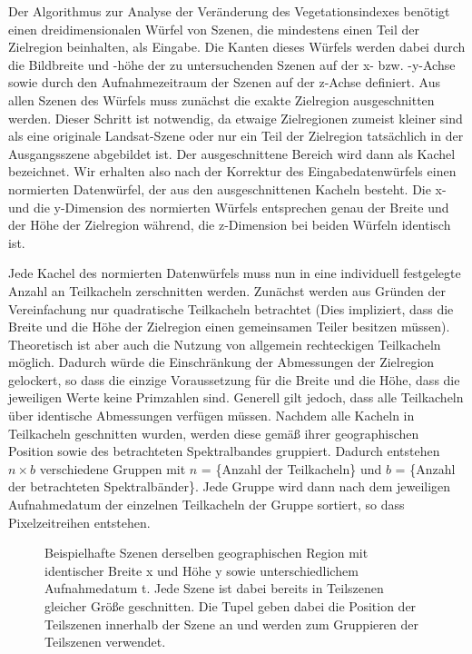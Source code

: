 Der Algorithmus zur Analyse der Veränderung des Vegetationsindexes benötigt einen dreidimensionalen Würfel von Szenen, die mindestens einen Teil der Zielregion beinhalten, als Eingabe. Die Kanten dieses Würfels werden dabei durch die Bildbreite und -höhe der zu untersuchenden Szenen auf der x- bzw. -y-Achse sowie durch den Aufnahmezeitraum der Szenen auf der z-Achse definiert. Aus allen Szenen des Würfels muss zunächst die exakte Zielregion ausgeschnitten werden. Dieser Schritt ist notwendig, da etwaige Zielregionen zumeist kleiner sind als eine originale Landsat-Szene oder nur ein Teil der Zielregion tatsächlich in der Ausgangsszene abgebildet ist. Der ausgeschnittene Bereich wird dann als Kachel bezeichnet. Wir erhalten also nach der Korrektur des Eingabedatenwürfels einen normierten Datenwürfel, der aus den ausgeschnittenen Kacheln besteht. Die x- und die y-Dimension des normierten Würfels entsprechen genau der Breite und der Höhe der Zielregion während, die z-Dimension bei beiden Würfeln identisch ist.

Jede Kachel des normierten Datenwürfels muss nun in eine individuell festgelegte Anzahl an Teilkacheln zerschnitten werden. Zunächst werden aus Gründen der Vereinfachung nur quadratische Teilkacheln betrachtet (Dies impliziert, dass die Breite und die Höhe der Zielregion einen gemeinsamen Teiler besitzen müssen). Theoretisch ist aber auch die Nutzung von allgemein rechteckigen Teilkacheln möglich. Dadurch würde die Einschränkung der Abmessungen der Zielregion gelockert, so dass die einzige Voraussetzung für die Breite und die Höhe, dass die jeweiligen Werte keine Primzahlen sind. Generell gilt jedoch, dass alle Teilkacheln über identische Abmessungen verfügen müssen. Nachdem alle Kacheln in Teilkacheln geschnitten wurden, werden diese gemäß ihrer geographischen Position sowie des betrachteten Spektralbandes gruppiert. Dadurch entstehen \(n \times b \) verschiedene Gruppen mit $n$ = \{Anzahl der Teilkacheln\} und $b$ = \{Anzahl der betrachteten Spektralbänder\}. Jede Gruppe wird dann nach dem jeweiligen Aufnahmedatum der einzelnen Teilkacheln der Gruppe sortiert, so dass Pixelzeitreihen entstehen. 

\begin{figure}
\centering

\caption{Beispielhafte Szenen derselben geographischen Region mit identischer Breite x und Höhe y sowie unterschiedlichem Aufnahmedatum t. Jede Szene ist dabei bereits in Teilszenen gleicher Größe geschnitten. Die Tupel geben dabei die Position der Teilszenen innerhalb der Szene an und werden zum Gruppieren der Teilszenen verwendet.} 
\label{fig:dataCube}
\end{figure}

